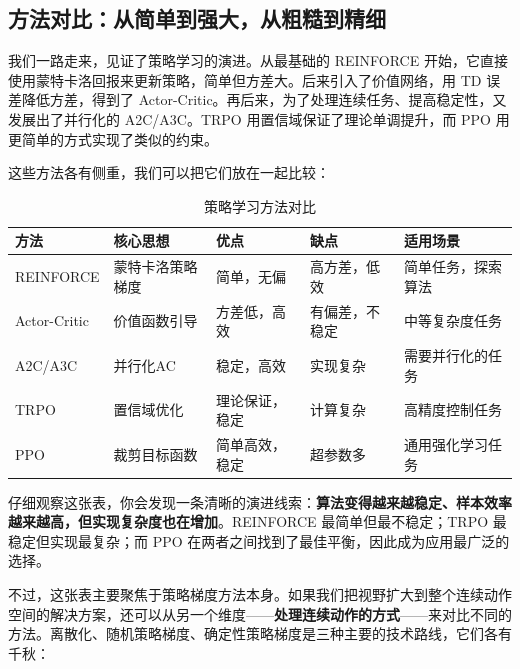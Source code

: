 \documentclass[lang=cn,zihao=-4,a4paper,fontset=windows]{beautybook}
\begin{document}
\subsection{方法对比：从简单到强大，从粗糙到精细}

我们一路走来，见证了策略学习的演进。从最基础的 REINFORCE 开始，它直接使用蒙特卡洛回报来更新策略，简单但方差大。后来引入了价值网络，用 TD 误差降低方差，得到了 Actor-Critic。再后来，为了处理连续任务、提高稳定性，又发展出了并行化的 A2C/A3C。TRPO 用置信域保证了理论单调提升，而 PPO 用更简单的方式实现了类似的约束。

这些方法各有侧重，我们可以把它们放在一起比较：

\begin{table}[H]
\centering
\caption{策略学习方法对比}
\begin{tabular}{p{}p{}p{}p{}p{}}
\toprule
\textbf{方法} & \textbf{核心思想} & \textbf{优点} & \textbf{缺点} & \textbf{适用场景} \\
\midrule
REINFORCE & 蒙特卡洛策略梯度 & 简单，无偏 & 高方差，低效 & 简单任务，探索算法 \\
Actor-Critic & 价值函数引导 & 方差低，高效 & 有偏差，不稳定 & 中等复杂度任务 \\
A2C/A3C & 并行化AC & 稳定，高效 & 实现复杂 & 需要并行化的任务 \\
TRPO & 置信域优化 & 理论保证，稳定 & 计算复杂 & 高精度控制任务 \\
PPO & 裁剪目标函数 & 简单高效，稳定 & 超参数多 & 通用强化学习任务 \\
\bottomrule
\end{tabular}
\end{table}

仔细观察这张表，你会发现一条清晰的演进线索：\textbf{算法变得越来越稳定、样本效率越来越高，但实现复杂度也在增加}。REINFORCE 最简单但最不稳定；TRPO 最稳定但实现最复杂；而 PPO 在两者之间找到了最佳平衡，因此成为应用最广泛的选择。

不过，这张表主要聚焦于策略梯度方法本身。如果我们把视野扩大到整个连续动作空间的解决方案，还可以从另一个维度——\textbf{处理连续动作的方式}——来对比不同的方法。离散化、随机策略梯度、确定性策略梯度是三种主要的技术路线，它们各有千秋：
\end{document}
